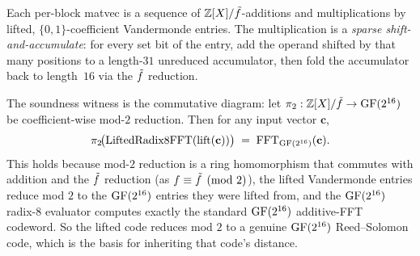 Each per-block matvec is a sequence of $\mathbb{Z}[X]/\tilde f$-additions and
multiplications by lifted, $\{0,1\}$-coefficient Vandermonde entries.
The multiplication is a \emph{sparse shift-and-accumulate}: for every
set bit of the entry, add the operand shifted by that many positions
to a length-$31$ unreduced accumulator, then fold the accumulator back
to length~$16$ via the $\tilde f$ reduction.

The soundness witness is the commutative diagram: let
$\pi_2 : \mathbb{Z}[X]/\tilde f \to \operatorname{GF}(2^{16})$ be coefficient-wise mod-$2$ reduction.
Then for any input vector $\mathbf c$,
\[
  \pi_2\!\bigl( \mathrm{LiftedRadix8FFT}(\mathrm{lift}(\mathbf c)) \bigr)
  \;=\;
  \mathrm{FFT}_{\operatorname{GF}(2^{16})}(\mathbf c).
\]
This holds because mod-$2$ reduction is a ring homomorphism that
commutes with addition and the $\tilde f$ reduction (as
$f \equiv \tilde f \pmod 2$), the lifted Vandermonde entries reduce mod
$2$ to the $\operatorname{GF}(2^{16})$ entries they were lifted from, and the
$\operatorname{GF}(2^{16})$ radix-8 evaluator computes exactly the standard
$\operatorname{GF}(2^{16})$ additive-FFT codeword. So the lifted code reduces mod $2$
to a genuine $\operatorname{GF}(2^{16})$ Reed--Solomon code, which is the basis for
inheriting that code's distance.
